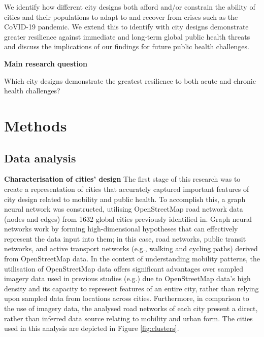 \documentclass[preprint,12pt]{elsarticle}
\begin{document}
We  identify how different city designs both afford and/or constrain the ability of cities and their populations to adapt to and recover from crises such as the CoVID-19 pandemic. We extend this to identify with city designs demonstrate greater resilience against immediate and long-term global public health threats and discuss the implications of our findings for future public health challenges.


\textbf{Main research question}

 Which city designs demonstrate the greatest resilience to both acute and chronic health challenges?








\section*{Methods}



\subsection*{Data analysis}
\textbf{Characterisation of cities' design}
The first stage of this research was to create a representation of cities that accurately captured important features of city design related to mobility and public health. To accomplish this, a graph neural network was constructed, utilising OpenStreetMap road network data\cite{Boeing2017a} (nodes and edges) from 1632 global cities previously identified in\cite{Thompson2020}. Graph neural networks work by forming high-dimensional hypotheses that can effectively represent the data input into them; in this case, road networks, public transit networks, and active transport networks (e.g., walking and cycling paths) derived from OpenStreetMap data. In the context of understanding mobility patterns, the utilisation of OpenStreetMap data offers significant advantages over sampled imagery data used in previous studies (e.g.\cite{Thompson2020,seneviratne2021self}) due to OpenStreetMap data's high density and its capacity to represent features of an entire city, rather than relying upon sampled data from locations across cities. Furthermore, in comparison to the use of imagery data, the analysed road networks of each city present a direct, rather than inferred data source relating to mobility and urban form. The cities used in this analysis are depicted in Figure \ref{fig:clusters}.
\end{document}
